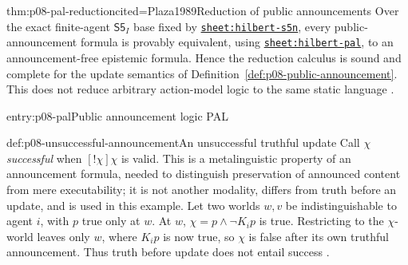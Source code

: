 \begin{hbtheorem}{thm:p08-pal-reduction}{cited=Plaza1989}{Reduction of public announcements}
Over the exact finite-agent \(\mathsf{S5}_{I}\) base fixed by
\hyperref[sheet:hilbert-s5n]{\texttt{sheet:hilbert-s5n}}, every public-announcement
formula is provably equivalent, using
\hyperref[sheet:hilbert-pal]{\texttt{sheet:hilbert-pal}}, to an
announcement-free epistemic formula.  Hence the reduction calculus is sound
and complete for the update semantics of
Definition~\ref{def:p08-public-announcement}.  This does not reduce arbitrary
action-model logic to the same static language
\cite{VanDitmarschVanDerHoekKooi2007}.
\end{hbtheorem}

\begin{systementry}{entry:p08-pal}{Public announcement logic PAL}
\end{systementry}

\begin{hbexample}{def:p08-unsuccessful-announcement}{An unsuccessful truthful update}
Call \(\chi\) \emph{successful} when \([!\chi]\chi\) is valid.  This is a
metalinguistic property of an announcement formula, needed to distinguish
preservation of announced content from mere executability; it is not another
modality, differs from truth before an update, and is used in this example.
Let two worlds \(w,v\) be indistinguishable to agent \(i\), with \(p\) true
only at \(w\).  At \(w\), \(\chi=p\land\neg K_ip\) is true.  Restricting to
the \(\chi\)-world leaves only \(w\), where \(K_ip\) is now true, so \(\chi\)
is false after its own truthful announcement.  Thus truth before update does
not entail success \cite{VanDitmarschVanDerHoekKooi2007}.
\end{hbexample}

